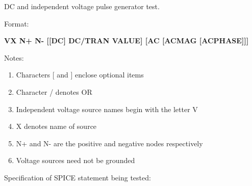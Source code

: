 %
%
%
%

\renewcommand{\thesubfigure}{\thefigure(\alph{subfigure})}
\makeatletter
  \renewcommand{\@thesubfigure}{\thesubfigure:\space}
  \renewcommand{\p@subfigure}{}
\makeatother

\renewcommand{\thesubtable}{\thetable(\alph{subtable})}
\makeatletter
  \renewcommand{\@thesubtable}{\thesubtable:\space}
  \renewcommand{\p@subtable}{}
\makeatother

DC and independent voltage pulse generator test.


Format:
\linebreak 
\bigskip 
\begin{footnotesize}\textbf{VX N+ N- [[DC]  DC/TRAN VALUE]  [AC [ACMAG [ACPHASE]]]}                                                         \end{footnotesize}

Notes: 
\begin{enumerate}
 \item Characters [ and ] enclose optional items
 \item Character / denotes OR
 \item Independent voltage source names begin with the letter V
 \item X denotes name of source
 \item N+ and N- are the positive and negative nodes respectively
 \item Voltage sources need not be grounded
\end{enumerate}

\begin{flushleft}
Specification of SPICE statement being tested:                                              \end{flushleft}



